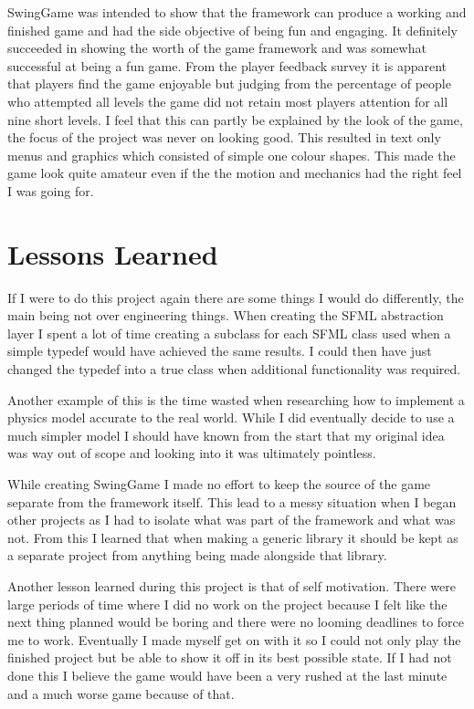 \documentclass[]{report}
\begin{document}
	SwingGame was intended to show that the framework can produce a working and finished game and had the side objective of being fun and engaging. It definitely succeeded in showing the worth of the game framework and was somewhat successful at being a fun game. From the player feedback survey it is apparent that players find the game enjoyable but judging from the percentage of people who attempted all levels the game did not retain most players attention for all nine short levels. I feel that this can partly be explained by the look of the game, the focus of the project was never on looking good. This resulted in text only menus and graphics which consisted of simple one colour shapes. This made the game look quite amateur even if the the motion and mechanics had the right feel I was going for.
	
	\section{Lessons Learned}
	If I were to do this project again there are some things I would do differently, the main being not over engineering things. When creating the SFML abstraction layer I spent a lot of time creating a subclass for each SFML class used when a simple typedef would have achieved the same results. I could then have just changed the typedef into a true class when additional functionality was required.
	
	Another example of this is the time wasted when researching how to implement a physics model accurate to the real world. While I did eventually decide to use a much simpler model I should have known from the start that my original idea was way out of scope and looking into it was ultimately pointless.
	
	While creating SwingGame I made no effort to keep the source of the game separate from the framework itself. This lead to a messy situation when I began other projects as I had to isolate what was part of the framework and what was not. From this I learned that when making a generic library it should be kept as a separate project from anything being made alongside that library.
	
	Another lesson learned during this project is that of self motivation. There were large periods of time where I did no work on the project because I felt like the next thing planned would be boring and there were no looming deadlines to force me to work. Eventually I made myself get on with it so I could not only play the finished project but be able to show it off in its best possible state. If I had not done this I believe the game would have been a very rushed at the last minute and a much worse game because of that.
	
\end{document}
